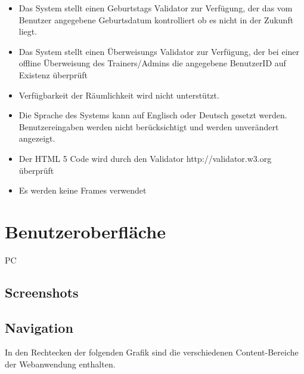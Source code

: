 \documentclass[a4paper]{scrreprt}
\begin{document}
\begin{itemize}
	\item \Func{} Das System stellt einen Geburtstags Validator zur Verfügung, der das vom Benutzer angegebene Geburtsdatum kontrolliert ob es nicht in der Zukunft liegt. 
	\item \Func{} Das System stellt einen Überweisungs Validator zur Verfügung, der bei einer offline Überweisung des Trainers/Admins die angegebene BenutzerID auf Existenz überprüft  
	\item \Func{} Verfügbarkeit der Räumlichkeit wird nicht unterstützt.
	\item \Func{} Die Sprache des Systems kann auf Englisch oder Deutsch gesetzt werden. Benutzereingaben werden nicht berücksichtigt und werden unverändert angezeigt.
	\item Der HTML 5 Code wird durch den Validator http://validator.w3.org überprüft
	\item Es werden keine Frames verwendet
\end{itemize}

		
		
 
\chapter{Benutzeroberfläche}
	\begin{tiny}
		PC
	\end{tiny}
   
    \section{Screenshots}
    
	    \subsection{}
    
	    \subsection{}
    
    \section{Navigation}
	    In den Rechtecken der folgenden Grafik sind die verschiedenen Content-Bereiche der Webanwendung enthalten.
		    \newline
		    \newline
		    \newline
    
\end{document}
